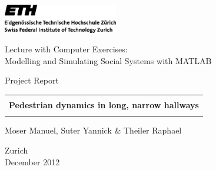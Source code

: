 \thispagestyle{empty}

\begin{center}
\includegraphics[width=5cm]{ETHlogo.eps}

\bigskip
\bigskip
\bigskip


\LARGE{ 	Lecture with Computer Exercises:\\ }
\LARGE{ Modelling and Simulating Social Systems with MATLAB\\}

\bigskip
\bigskip

\small{Project Report}\\

\bigskip
\bigskip
\bigskip
\bigskip


\begin{tabular}{|c|}
\hline
\\
\textbf{\LARGE{Pedestrian dynamics in long, narrow hallways}}\\
\\
\hline
\end{tabular}

\bigskip
\bigskip
\bigskip

\LARGE{Moser Manuel, Suter Yannick \& Theiler Raphael}

\bigskip
\bigskip
\bigskip
\bigskip
\bigskip
\bigskip
\bigskip
\bigskip

Zurich\\
December 2012\\

\end{center}